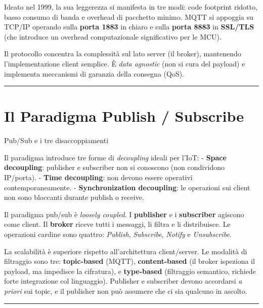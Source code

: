 \documentclass[
  italian,
  openany]{book}
\begin{document}
Ideato nel 1999, la sua leggerezza si manifesta in tre modi: code
footprint ridotto, basso consumo di banda e overhead di pacchetto
minimo. MQTT si appoggia su TCP/IP operando sulla \textbf{porta 1883} in
chiaro e sulla \textbf{porta 8883} in \textbf{SSL/TLS} (che introduce un
overhead computazionale significativo per le MCU).

Il protocollo concentra la complessità sul lato server (il broker),
mantenendo l'implementazione client semplice. È \emph{data agnostic}
(non si cura del payload) e implementa meccanismi di garanzia della
consegna (QoS).

\begin{center}\rule{0.5\linewidth}{0.5pt}\end{center}

\section{Il Paradigma Publish /
Subscribe}\label{il-paradigma-publish-subscribe}

\begin{callouttip}{Pub/Sub e i tre disaccoppiamenti}

Il paradigma introduce tre forme di \emph{decoupling} ideali per l'IoT:
- \textbf{Space decoupling}: publisher e subscriber non si conoscono
(non condividono IP/porta). - \textbf{Time decoupling}: non devono
essere operativi contemporaneamente. - \textbf{Synchronization
decoupling}: le operazioni sui client non sono bloccanti durante publish
o receive.

\end{callouttip}

Il paradigma pub/sub è \emph{loosely coupled}. I \textbf{publisher} e i
\textbf{subscriber} agiscono come client. Il \textbf{broker} riceve
tutti i messaggi, li filtra e li distribuisce. Le operazioni cardine
sono quattro: \emph{Publish}, \emph{Subscribe}, \emph{Notify} e
\emph{Unsubscribe}.

La scalabilità è superiore rispetto all'architettura client/server. Le
modalità di filtraggio sono tre: \textbf{topic-based} (MQTT),
\textbf{content-based} (il broker ispeziona il payload, ma impedisce la
cifratura), e \textbf{type-based} (filtraggio semantico, richiede forte
integrazione col linguaggio). Publisher e subscriber devono accordarsi
\emph{a priori} sui topic, e il publisher non può assumere che ci sia
qualcuno in ascolto.

\begin{center}\rule{0.5\linewidth}{0.5pt}\end{center}
\end{document}
